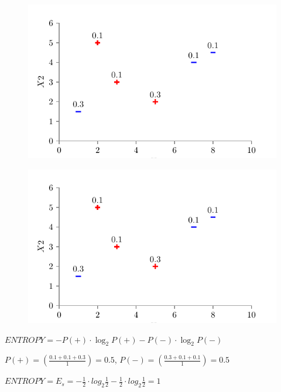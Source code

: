 \documentclass[usenames,dvipsnames]{beamer}
\begin{document}
	
	\begin{frame}
	
	\begin{figure}
		\centering
		\includegraphics{../assets/decision-trees/figures/dt_weighted/fig2.pdf}
	\end{figure}
	
	
	\end{frame}
	
	
	\begin{frame}
	
	\begin{figure}
		\centering
		\includegraphics{../assets/decision-trees/figures/dt_weighted/fig2.pdf}
	\end{figure}
	
	\(ENTROPY = - P(+) \cdot \log_2 P(+) - P(-) \cdot \log_2 P(-)\)
	
	\(P(+) = \left( \frac{0.1 + 0.1 + 0.3}{1} \right) = 0.5\),      \(P(-) = \left( \frac{0.3 + 0.1 + 0.1}{1} \right) = 0.5\)
	
	\(ENTROPY  = E_s =  - \frac{1}{2} \cdot log_2 \frac{1}{2}  - \frac{1}{2} \cdot log_2 \frac{1}{2}  = 1\)
	
	\end{frame}
	
\end{document}
